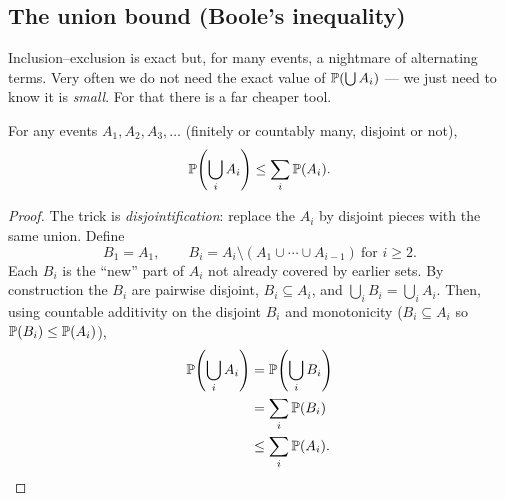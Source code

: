 \subsection{The union bound (Boole's inequality)}
\label{ch03:union-bound}

Inclusion--exclusion is exact but, for many events, a nightmare of alternating
terms. Very often we do not need the exact value of $\P(\bigcup A_i)$ --- we just
need to know it is \emph{small}. For that there is a far cheaper tool.

\begin{theorem}
\label{ch03:thm-union-bound}
For any events $A_1, A_2, A_3, \dots$ (finitely or countably many, disjoint or
not),
\[
\P\!\left(\bigcup_{i} A_i\right) \le \sum_{i} \P(A_i).
\]
\end{theorem}

\begin{proof}
The trick is \emph{disjointification}: replace the $A_i$ by disjoint pieces with
the same union. Define
\[
B_1 = A_1, \qquad B_i = A_i \setminus (A_1 \cup \cdots \cup A_{i-1}) \ \text{for } i \ge 2.
\]
Each $B_i$ is the ``new'' part of $A_i$ not already covered by earlier sets. By
construction the $B_i$ are pairwise disjoint, $B_i \subseteq A_i$, and
$\bigcup_i B_i = \bigcup_i A_i$. Then, using countable additivity on the disjoint
$B_i$ and monotonicity ($B_i \subseteq A_i$ so $\P(B_i) \le \P(A_i)$),
\begin{align*}
\P\!\left(\bigcup_i A_i\right) &= \P\!\left(\bigcup_i B_i\right) \\
&= \sum_i \P(B_i) \\
&\le \sum_i \P(A_i). \qedhere
\end{align*}
\end{proof}

